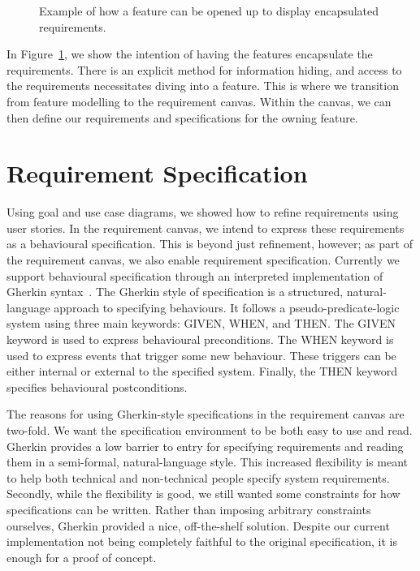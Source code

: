 \begin{figure}
	\centering
	
	\caption{Example of how a feature can be opened up to display encapsulated requirements.}
	\label{fig:feature-requirement}
\end{figure}

In Figure~\ref{fig:feature-requirement}, we show the intention of having the features encapsulate the requirements. There is an explicit method for information hiding, and access to the requirements necessitates diving into a feature. This is where we transition from feature modelling to the requirement canvas. Within the canvas, we can then define our requirements and specifications for the owning feature. 

\section{Requirement Specification}
\label{sec:req_spec}

Using goal and use case diagrams, we showed how to refine requirements using user stories. In the requirement canvas, we intend to express these requirements as a behavioural specification. This is beyond just refinement, however; as part of the requirement canvas, we also enable requirement specification. Currently we support behavioural specification through an interpreted implementation of Gherkin syntax~\cite{cucumberdocs}. The Gherkin style of specification is a structured, natural-language approach to specifying behaviours. It follows a pseudo-predicate-logic system using three main keywords: GIVEN, WHEN, and THEN. The GIVEN keyword is used to express behavioural preconditions. The WHEN keyword is used to express events that trigger some new behaviour. These triggers can be either internal or external to the specified system. Finally, the THEN keyword specifies behavioural postconditions. 

The reasons for using Gherkin-style specifications in the requirement canvas are two-fold. We want the specification environment to be both easy to use and read. Gherkin provides a low barrier to entry for specifying requirements and reading them in a semi-formal, natural-language style. This increased flexibility is meant to help both technical and non-technical people specify system requirements. Secondly, while the flexibility is good, we still wanted some constraints for how specifications can be written. Rather than imposing arbitrary constraints ourselves, Gherkin provided a nice, off-the-shelf solution. Despite our current implementation not being completely faithful to the original specification, it is enough for a proof of concept.

